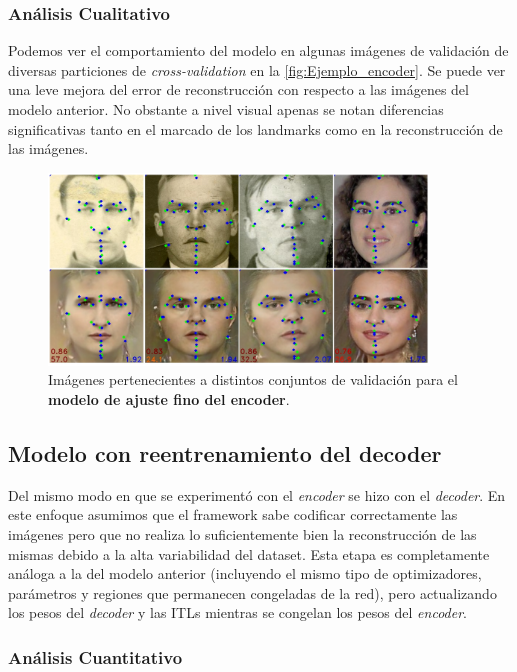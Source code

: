     
    \subsubsection*{Análisis Cualitativo}
    
    \noindent Podemos ver el comportamiento del modelo en algunas imágenes de validación de diversas particiones de \textit{cross-validation} en la \autoref{fig:Ejemplo_encoder}. Se puede ver una leve mejora del error de reconstrucción con respecto a las imágenes del modelo anterior. No obstante a nivel visual apenas se notan diferencias significativas tanto en el marcado de los landmarks como en la reconstrucción de las imágenes.

    \begin{figure}[H]
        \centering
        \includegraphics[width=0.9\textwidth]{img/image_encoder.png}
        \caption{Imágenes pertenecientes a distintos conjuntos de validación para el \textbf{modelo de ajuste fino del encoder}.}
        \label{fig:Ejemplo_encoder}
    \end{figure}

    \subsection{Modelo con reentrenamiento del decoder}
        \noindent Del mismo modo en que se experimentó con el \textit{encoder} se hizo con el \textit{decoder}. En este enfoque asumimos que el framework sabe codificar correctamente las imágenes pero que no realiza lo suficientemente bien la reconstrucción de las mismas debido a la alta variabilidad del dataset. Esta etapa es completamente análoga a la del modelo anterior (incluyendo el mismo tipo de optimizadores, parámetros y regiones que permanecen congeladas de la red), pero actualizando los pesos del \textit{decoder} y las ITLs mientras se congelan los pesos del \textit{encoder}.

        \subsubsection*{Análisis Cuantitativo}

